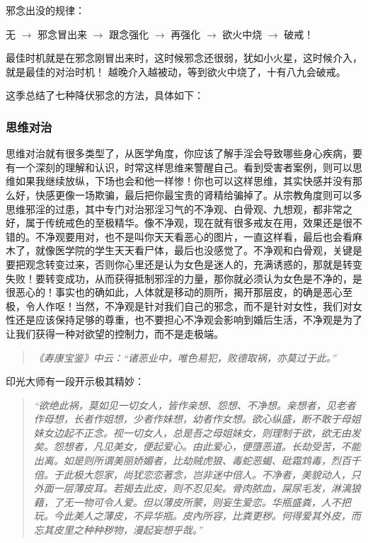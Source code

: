 \documentclass{ctexart}
\begin{document}
邪念出没的规律：

\begin{center}
    无 $\to$ 邪念冒出来 $\to$ 跟念强化 $\to$ 再强化 $\to$ 欲火中烧 $\to$ 破戒！
\end{center}

最佳时机就是在邪念刚冒出来时，这时候邪念还很弱，犹如小火星，这时候介入，就是最佳的对治时机！
越晚介入越被动，等到欲火中烧了，十有八九会破戒。

这季总结了七种降伏邪念的方法，具体如下：

\subsubsection{思维对治}

思维对治就有很多类型了，从医学角度，你应该了解手淫会导致哪些身心疾病，要有一个深刻的理解和认识，时常这样思维来警醒自己。看到受害者案例，则可以思维如果我继续放纵，下场也会和他一样惨！你也可以这样思维，其实快感并没有那么好，快感更像一场欺骗，最后把你最宝贵的肾精给骗掉了。从宗教角度则可以多思维邪淫的过患，其中专门对治邪淫习气的不净观、白骨观、九想观，都非常之好，属于传统戒色的至极精华。像不净观，现在就有很多戒友在用，效果还是很不错的。不净观要用对，也不是叫你天天看恶心的图片，一直这样看，最后也会看麻木了，就像医学院的学生天天看尸体，最后也没感觉了。不净观和白骨观，关键是要把观念转变过来，否则你心里还是认为女色是迷人的，充满诱惑的，那就是转变失败！要转变成功，从而获得抵制邪淫的力量，那你就必须认为女色是不净的，是很恶心的！事实也的确如此，人体就是移动的厕所，揭开那层皮，的确是恶心至极，令人作呕！当然，不净观是针对我们自己的邪念，而不是针对女性，我们对女性还是应该保持足够的尊重，也不要担心不净观会影响到婚后生活，不净观是为了让我们获得一种对欲望的控制力，而不是走极端。

\begin{quote}\it
    《寿康宝鉴》中云：“诸恶业中，唯色易犯，败德取祸，亦莫过于此。”
\end{quote}

印光大师有一段开示极其精妙：

\begin{quote}\it
    “欲绝此祸，莫如见一切女人，皆作亲想、怨想、不净想。亲想者，见老者作母想，长者作姐想，少者作妹想，幼者作女想。欲心纵盛，断不敢于母姐妹女边起不正念。视一切女人，总是吾之母姐妹女，则理制于欲，欲无由发矣。怨想者，凡见美女，便起爱心。由此爱心，便墮恶道。长劫受苦，不能出离。如是则所谓美丽娇媚者，比劫贼虎狼、毒蛇恶蝎、砒霜鸩毒，烈百千倍。于此极大怨家，尚犹恋恋著念，岂非迷中倍人。不净者，美貌动人，只外面一层薄皮耳。若揭去此皮，则不忍见矣。骨肉脓血，屎尿毛发，淋漓狼藉，了无一物可令人爱。但以薄皮所蒙，则妄生爱恋。华瓶盛粪，人不把玩。今此美人之薄皮，不异华瓶。皮內所容，比粪更秽。何得爱其外皮，而忘其皮里之种种秽物，漫起妄想乎哉。”
\end{quote}
\end{document}
